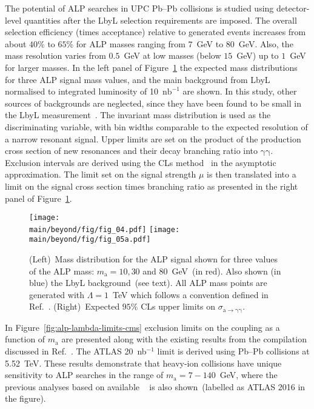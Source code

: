 The potential of ALP searches in UPC Pb--Pb collisions is studied using detector-level quantities after the LbyL selection requirements are imposed. The overall selection efficiency (times acceptance) relative to generated events increases from about $40$\% to $65$\% for ALP masses ranging from $7$~GeV to $80$~GeV. Also, the mass resolution varies from $0.5$~GeV at low masses (below $15$~GeV) up to $1$~GeV for larger masses. In the left panel of Figure~\ref{fig:alp} the expected mass distributions for three ALP signal mass values, and the main background from LbyL normalised to integrated luminosity of 10~$\mathrm{nb}^{-1}$ are shown. In this study, other sources of backgrounds are neglected, since they have been found to be small in the LbyL measurement~\cite{Aaboud:2017bwk}. The invariant mass distribution is used as the discriminating variable, with bin widths comparable to the expected resolution of a narrow resonant signal.
Upper limits are set on the product of the production cross section of
new resonances and their decay branching ratio into $\mathrm{\gamma\gamma}$. Exclusion intervals are derived using the CLs method~\cite{Read:2002hq} in the asymptotic approximation. The limit set on the signal strength $\mu$ is then translated into a limit on the signal cross section times branching ratio as presented in the right panel of Figure~\ref{fig:alp}.
\begin{figure}[!htbp]
\centering
  \texttt{[image: \\main/beyond/fig/fig\_04.pdf]}
  \texttt{[image: \\main/beyond/fig/fig\_05a.pdf]}
  \caption{(Left)~Mass distribution for the ALP signal
  shown for three values of the ALP mass: $m_\mathrm{a}=10, 30$ and
  $80$~GeV~(in red). Also shown (in blue) the LbyL background~(see
  text). All ALP mass points are generated with $\Lambda = 1$~TeV which follows a convention defined in Ref.~\cite{Knapen:2016moh}.
  (Right)~Expected $95$\% CLs upper limits on $\sigma_{\mathrm{a\rightarrow \gamma \gamma}}$.}
  \label{fig:alp}
\end{figure}

In Figure~\ref{fig:alp-lambda-limits-cms} exclusion limits on the coupling as a function of $m_\mathrm{a}$ are presented along with the existing results from the compilation discussed in Ref.~\cite{Baldenegro:2018hng}. The ATLAS 20~nb$^{-1}$ limit is derived using Pb--Pb collisions at 5.52~TeV. These results demonstrate that heavy-ion collisions have unique sensitivity to ALP searches in the range of $m_\mathrm{a}=7-140$~GeV, where the previous analyses based on available ~\cite{Knapen:2016moh} is also shown~(labelled as ATLAS 2016 in the figure).

